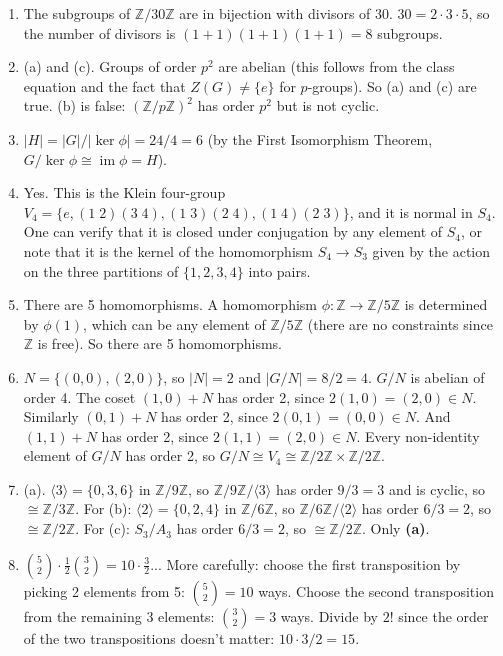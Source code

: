 \documentclass[11pt]{article}
\begin{document}
\begin{enumerate}
\item The subgroups of $\mathbb{Z}/30\mathbb{Z}$ are in bijection with divisors of 30. $30=2\cdot 3\cdot 5$, so the number of divisors is $(1+1)(1+1)(1+1)=8$ subgroups.

\item (a) and (c). Groups of order $p^2$ are abelian (this follows from the class equation and the fact that $Z(G)\neq\{e\}$ for $p$-groups). So (a) and (c) are true. (b) is false: $(\mathbb{Z}/p\mathbb{Z})^2$ has order $p^2$ but is not cyclic.

\item $|H|=|G|/|\ker\phi|=24/4=6$ (by the First Isomorphism Theorem, $G/\ker\phi\cong\operatorname{im}\phi=H$).

\item Yes. This is the Klein four-group $V_4=\{e,(1\;2)(3\;4),(1\;3)(2\;4),(1\;4)(2\;3)\}$, and it is normal in $S_4$. One can verify that it is closed under conjugation by any element of $S_4$, or note that it is the kernel of the homomorphism $S_4\to S_3$ given by the action on the three partitions of $\{1,2,3,4\}$ into pairs.

\item There are 5 homomorphisms. A homomorphism $\phi\colon\mathbb{Z}\to\mathbb{Z}/5\mathbb{Z}$ is determined by $\phi(1)$, which can be any element of $\mathbb{Z}/5\mathbb{Z}$ (there are no constraints since $\mathbb{Z}$ is free). So there are 5 homomorphisms.

\item $N=\{(0,0),(2,0)\}$, so $|N|=2$ and $|G/N|=8/2=4$. $G/N$ is abelian of order 4. The coset $(1,0)+N$ has order 2, since $2(1,0)=(2,0)\in N$. Similarly $(0,1)+N$ has order 2, since $2(0,1)=(0,0)\in N$. And $(1,1)+N$ has order 2, since $2(1,1)=(2,0)\in N$. Every non-identity element of $G/N$ has order 2, so $G/N\cong V_4\cong\mathbb{Z}/2\mathbb{Z}\times\mathbb{Z}/2\mathbb{Z}$.

\item (a). $\langle 3\rangle=\{0,3,6\}$ in $\mathbb{Z}/9\mathbb{Z}$, so $\mathbb{Z}/9\mathbb{Z}/\langle 3\rangle$ has order $9/3=3$ and is cyclic, so $\cong\mathbb{Z}/3\mathbb{Z}$. For (b): $\langle 2\rangle=\{0,2,4\}$ in $\mathbb{Z}/6\mathbb{Z}$, so $\mathbb{Z}/6\mathbb{Z}/\langle 2\rangle$ has order $6/3=2$, so $\cong\mathbb{Z}/2\mathbb{Z}$. For (c): $S_3/A_3$ has order $6/3=2$, so $\cong\mathbb{Z}/2\mathbb{Z}$. Only \textbf{(a)}.

\item $\binom{5}{2}\cdot\frac{1}{2}\binom{3}{2}=10\cdot\frac{3}{2}$... More carefully: choose the first transposition by picking 2 elements from 5: $\binom{5}{2}=10$ ways. Choose the second transposition from the remaining 3 elements: $\binom{3}{2}=3$ ways. Divide by $2!$ since the order of the two transpositions doesn't matter: $10\cdot 3/2=15$.


\end{enumerate}
\end{document}
